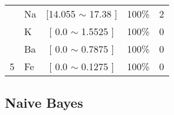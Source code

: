 \begin{table}[!h]
\begin{tabular}{llcrc}
                                            & Na    & [14.055 $\sim$ 17.38  ]           & 100\%                             & 2 \\
                                            & K     & [ 0.0 $\sim$  1.5525      ]       & 100\%                               & 0 \\  
                                            & Ba    & [ 0.0 $\sim$  0.7875     ]       & 100\%                               & 0 \\   
\multirow{-4}{*}{5}                          & Fe    & [ 0.0 $\sim$  0.1275     ]       & 100\%                               & 0 \\  \hline
\hline

\end{tabular}
\end{table}






\subsection{Naive Bayes} \label{cap:resultados:ssec:glass:cart}
